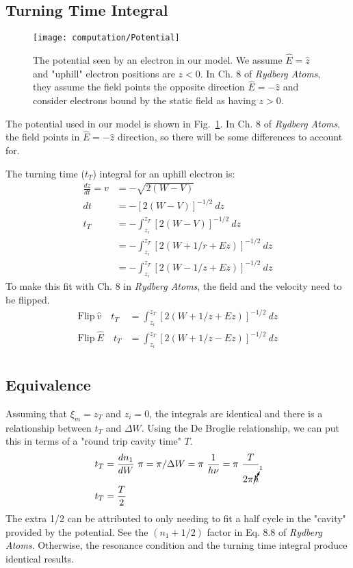 \documentclass[aps,pra,preprint,groupedaddress]{revtex4-1}
\begin{document}
\subsection{\label{sec:tt} Turning Time Integral}

\begin{figure}
\texttt{[image: computation/Potential]}
\caption{\label{fig:pot} The potential seen by an electron in our model. We assume $\hat{E} = \hat{z}$ and "uphill" electron positions are $z < 0$. In Ch. 8 of \emph{Rydberg Atoms}, they assume the field points the opposite direction $\hat{E} = - \hat{z}$ and consider electrons bound by the static field as having $z > 0$.}
\end{figure}

The potential used in our model is shown in Fig.~\ref{fig:pot}. In Ch. 8 of \emph{Rydberg Atoms}, the field points in $\hat{E} = -\hat{z}$ direction, so there will be some differences to account for.

The turning time ($t_T$) integral for an uphill electron is:
\begin{align*}
\frac{dz}{dt} = v & = - \sqrt{2(W - V)} \\
dt & = - [2(W - V)]^{-1/2} ~ dz \\
t_T & = - \int_{z_i}^{z_T} [2(W - V)]^{-1/2} ~ dz \\
 & = - \int_{z_i}^{z_T} [2(W + 1/r + Ez)]^{-1/2} ~ dz \\
 & = - \int_{z_i}^{z_T} [2(W - 1/z + Ez)]^{-1/2} ~ dz
\end{align*}
To make this fit with Ch. 8 in \emph{Rydberg Atoms}, the field and the velocity need to be flipped.
\begin{align*}
\text{Flip} ~ \hat{v} \quad t_T & = \int_{z_i}^{z_T} [2(W + 1/z + Ez)]^{-1/2} ~ dz \\
\text{Flip} ~ \hat{E} \quad t_T & = \int_{z_i}^{z_T} [2(W + 1/z - Ez)]^{-1/2} ~ dz \\
\end{align*}

\subsection{\label{sec:eq} Equivalence}

Assuming that $\xi_m = z_T$ and $z_i = 0$, the integrals are identical and there is a relationship between $t_T$ and $\Delta W$. Using the De Broglie relationship, we can put this in terms of a "round trip cavity time" $T$.
\begin{align*}
t_T & = \frac{dn_1}{dW} ~ \pi
 = \pi / \Delta W
 = \pi ~ \frac{1}{h \nu}
 = \pi ~ \frac{T}{2 \pi \cancelto{1}{\hbar}} \\
t_T & = \frac{T}{2}
\end{align*}
The extra 1/2 can be attributed to only needing to fit a half cycle in the "cavity" provided by the potential. See the $(n_1 + 1/2)$ factor in Eq. 8.8 of \emph{Rydberg Atoms}. Otherwise, the resonance condition and the turning time integral produce identical results.
\end{document}
